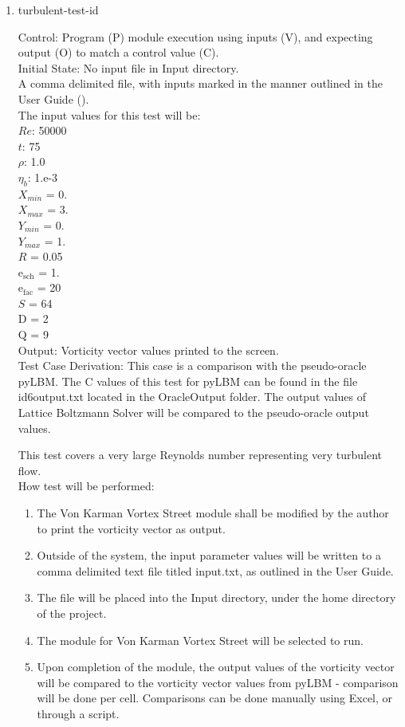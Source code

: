 \documentclass[12pt, titlepage]{article}
\newcommand{\famname}{Lattice Boltzmann Solver}
\newcounter{testcounter} %
\begin{document}
\begin{enumerate}
\item{turbulent-test-id\thetestcounter \\}

Control: Program (P) module execution using inputs (V), and expecting output (O)
to match a control value (C).\\
					
Initial State: No input file in Input directory.\\
					
A comma delimited file, with inputs marked in the manner outlined in the User
Guide (\citet{LBM_UserGuide_PM}).\\The input values for this test will be:\\
$Re$: 50000\\
$t$: 75\\
$\rho$: 1.0\\
$\eta_b$: 1.e-3\\
$X_{min}$ = 0.\\
$X_{max}$ = 3.\\
$Y_{min}$ = 0.\\
$Y_{max}$ = 1.\\
$R$ = 0.05\\
$\mathrm{e_{sch}}$ = 1.\\
$\mathrm{e_{fac}}$ = 20\\
$S$ = 64\\
$\mathrm{D}$ = 2\\
$\mathrm{Q}$ = 9\\

Output: Vorticity vector values printed to the screen. \\

Test Case Derivation: This case is a comparison with the pseudo-oracle
pyLBM. The C values of this test for pyLBM can be found in the file
id6output.txt located in the OracleOutput folder. The output values of {\famname} will be compared to the pseudo-oracle output values.

This test covers a very large Reynolds number representing very turbulent flow.\\	
					
How test will be performed: 

\begin{enumerate}
\item The Von Karman Vortex Street module shall be modified by the author to
  print the vorticity vector as output.
\item Outside of the system, the input parameter values will be written to a
  comma delimited text file titled input.txt, as outlined in the User Guide.
\item The file will be placed into the Input directory, under the home directory of the project.
\item The module for Von Karman Vortex Street will be selected to run.
\item Upon completion of the module, the output values of the vorticity vector
  will be compared to the vorticity vector values from pyLBM - comparison will
  be done per cell. Comparisons can be done manually using Excel, or through a
  script.
\end{enumerate}


\end{enumerate}
\end{document}
